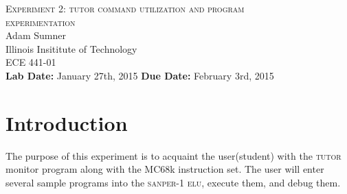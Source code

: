 \documentclass[12pt, twocolumn]{article}
\begin{document}
\begin{titlepage}
	\begin{center}
		
		
		\vfill
		
		\textsc{\LARGE Experiment 2: tutor command utilization and program\\ experimentation}\\[1.5cm]
		
		\Large Adam Sumner\\[0.5cm]
		
		\Large Illinois Insititute of Technology\\[0.5cm]
		
		\Large ECE 441-01\\[0.5cm]	
		\noindent
		\vfill
		\large \textbf{Lab Date:} January 27th, 2015\hfill
		\large \textbf{Due Date:} February 3rd, 2015
		
		
	\end{center}
\end{titlepage}

\section{Introduction}
The purpose of this experiment is to acquaint the user(student) with the \textsc{tutor} monitor program along with the MC68k instruction set. The user will enter several sample programs into the \textsc{sanper-1 elu}, execute them, and debug them. 
\end{document}
